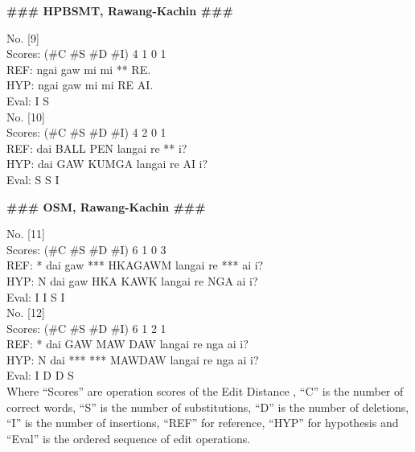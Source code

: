 \documentclass[conference]{IEEEtran}
\newcommand{\quotes}[1]{``#1''}
\begin{document}
\begin{center} \textbf{\#\#\# HPBSMT, Rawang-Kachin \#\#\#}  \\ \end{center}

\noindent No. [9]\\
\noindent Scores: (\#C \#S \#D \#I) 4 1 0 1\\
REF:  ngai gaw mi mi ** RE. \\
HYP:  ngai gaw mi mi RE AI. \\
Eval:                I  S  \\

\noindent No. [10]\\
\noindent Scores: (\#C \#S \#D \#I) 4 2 0 1\\
REF:  dai BALL PEN   langai re ** i? \\
HYP:  dai GAW  KUMGA langai re AI i? \\
Eval:     S    S               I  \\

\begin{center} \textbf{\#\#\# OSM, Rawang-Kachin \#\#\#}  \\ \end{center}

\noindent No. [11]\\
\noindent Scores: (\#C \#S \#D \#I) 6 1 0 3\\
REF:  * dai gaw *** HKAGAWM langai re *** ai i? \\
HYP:  N dai gaw HKA KAWK    langai re NGA ai i? \\
Eval: I         I   S                 I   \\

\noindent No. [12]\\
\noindent Scores: (\#C \#S \#D \#I) 6 1 2 1\\
REF:  * dai GAW MAW DAW    langai re nga ai i? \\
HYP:  N dai *** *** MAWDAW langai re nga ai i? \\
Eval: I     D   D   S\\

Where \quotes{Scores} are operation scores of the Edit Distance \cite{b27}, \quotes{C} is the number of correct words, \quotes{S} is the number of substitutions, \quotes{D} is the number of deletions, \quotes{I} is the number of insertions, \quotes{REF} for reference, \quotes{HYP} for hypothesis and \quotes{Eval} is the ordered sequence of edit operations.\\
\end{document}
